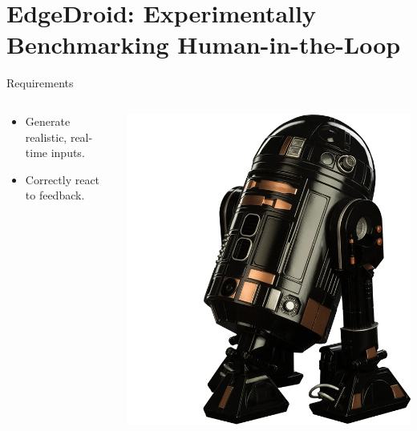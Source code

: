 \documentclass[aspectratio=1610]{beamer}
\begin{document}
\section{EdgeDroid: Experimentally Benchmarking Human-in-the-Loop}
\begin{ssframe}{Requirements}
    \begin{columns}[onlytextwidth]
        \begin{column}{.5\linewidth}
            \begin{itemize}
                \itemsep2em
                \item Generate realistic, real-time inputs.
                \item Correctly react to feedback.
            \end{itemize}
        \end{column}%
        \begin{column}{.5\linewidth}
            \centering%
            \includegraphics[width=.7\linewidth]{img/astromech.png}
        \end{column}
    \end{columns}
\end{ssframe}
\end{document}
